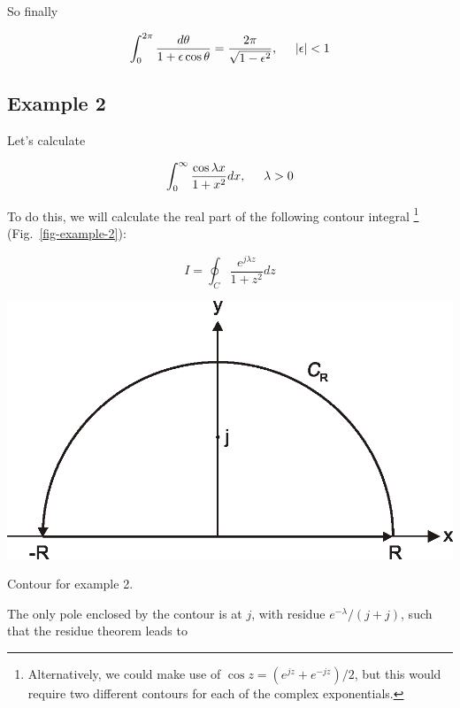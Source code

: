 So finally

\begin{equation}
\int_0^{2 \pi} \frac{d \theta}{1 + \epsilon \cos \theta} = \frac{2 \pi}{\sqrt{1
- \epsilon^2}}, \hspace{0.5cm} |\epsilon| < 1
\end{equation} 

\subsection*{Example 2}

Let's calculate

\begin{equation}
\int_0^{\infty}\frac{\cos \lambda x}{1 + x^2} dx, \hspace{0.5cm} \lambda > 0
\end{equation}

To do this, we will calculate the real part of the following contour integral
\footnote{Alternatively, we could make use of $\cos z = (e^{j z} + e^{-jz})/2$,
but this would require two different contours for each of the complex
exponentials.} (Fig.~\ref{fig-example-2}):

\begin{equation}
I = \oint_{{C}} \frac{e^{j \lambda z}}{1 + z^2} dz
\end{equation}

\begin{marginfigure}
\centering
\includegraphics{complex/figures/int_ex_2}
\caption{Contour for example 2.}
\label{fig-example-2}
\end{marginfigure}

The only pole enclosed by the contour is at $j$, with residue $e^{-\lambda}/(j
+j)$, such that the residue theorem leads to

